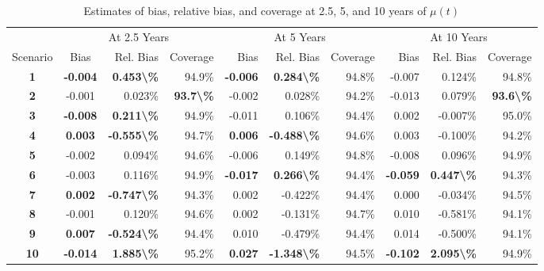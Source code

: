 \begin{table}

\caption{Estimates of bias, relative bias, and coverage at 2.5, 5, and 10 years of $\mu(t)$}
\centering
\begin{tabular}[t]{>{}ccrrrrrrrr}
\toprule
\multicolumn{1}{c}{ } & \multicolumn{3}{c}{At 2.5 Years} & \multicolumn{3}{c}{At 5 Years} & \multicolumn{3}{c}{At 10 Years} \\
\cmidrule(l{3pt}r{3pt}){2-4} \cmidrule(l{3pt}r{3pt}){5-7} \cmidrule(l{3pt}r{3pt}){8-10}
Scenario & Bias & Rel. Bias & Coverage & Bias & Rel. Bias & Coverage & Bias & Rel. Bias & Coverage\\
\midrule
\textbf{1} & \textbf{-0.004} & \textbf{ 0.453\textbackslash{}\%} & 94.9\% & \textbf{-0.006} & \textbf{ 0.284\textbackslash{}\%} & 94.8\% & -0.007 & 0.124\% & 94.8\%\\

\textbf{2} & -0.001 & 0.023\% & \textbf{93.7\textbackslash{}\%} & -0.002 & 0.028\% & 94.2\% & -0.013 & 0.079\% & \textbf{93.6\textbackslash{}\%}\\

\textbf{3} & \textbf{-0.008} & \textbf{ 0.211\textbackslash{}\%} & 94.9\% & -0.011 & 0.106\% & 94.4\% & 0.002 & -0.007\% & 95.0\%\\

\rule{0pt}{4ex}
\textbf{4} & \textbf{ 0.003} & \textbf{-0.555\textbackslash{}\%} & 94.7\% & \textbf{ 0.006} & \textbf{-0.488\textbackslash{}\%} & 94.6\% & 0.003 & -0.100\% & 94.2\%\\

\textbf{5} & -0.002 & 0.094\% & 94.6\% & -0.006 & 0.149\% & 94.8\% & -0.008 & 0.096\% & 94.9\%\\

\textbf{6} & -0.003 & 0.116\% & 94.9\% & \textbf{-0.017} & \textbf{ 0.266\textbackslash{}\%} & 94.4\% & \textbf{-0.059} & \textbf{ 0.447\textbackslash{}\%} & 94.3\%\\

\rule{0pt}{4ex}
\textbf{7} & \textbf{ 0.002} & \textbf{-0.747\textbackslash{}\%} & 94.3\% & 0.002 & -0.422\% & 94.4\% & 0.000 & -0.034\% & 94.5\%\\

\textbf{8} & -0.001 & 0.120\% & 94.6\% & 0.002 & -0.131\% & 94.7\% & 0.010 & -0.581\% & 94.1\%\\

\textbf{9} & \textbf{ 0.007} & \textbf{-0.524\textbackslash{}\%} & 94.4\% & 0.010 & -0.479\% & 94.4\% & 0.014 & -0.500\% & 94.1\%\\

\rule{0pt}{4ex}
\textbf{10} & \textbf{-0.014} & \textbf{ 1.885\textbackslash{}\%} & 95.2\% & \textbf{ 0.027} & \textbf{-1.348\textbackslash{}\%} & 94.5\% & \textbf{-0.102} & \textbf{ 2.095\textbackslash{}\%} & 94.9\%\\
\bottomrule
\end{tabular}
\end{table}
